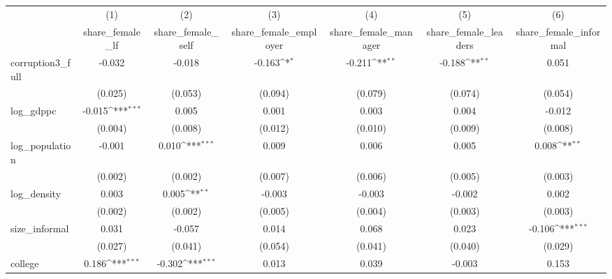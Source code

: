{
\def\sym#1{\ifmmode^{#1}\else\(^{#1}\)\fi}
\begin{tabular}{l*{6}{c}}
\hline\hline
            &\multicolumn{1}{c}{(1)}&\multicolumn{1}{c}{(2)}&\multicolumn{1}{c}{(3)}&\multicolumn{1}{c}{(4)}&\multicolumn{1}{c}{(5)}&\multicolumn{1}{c}{(6)}\\
            &\multicolumn{1}{c}{share\_female\_lf}&\multicolumn{1}{c}{share\_female\_self}&\multicolumn{1}{c}{share\_female\_employer}&\multicolumn{1}{c}{share\_female\_manager}&\multicolumn{1}{c}{share\_female\_leaders}&\multicolumn{1}{c}{share\_female\_informal}\\
\hline
corruption3\_full&      -0.032         &      -0.018         &      -0.163\sym{*}  &      -0.211\sym{**} &      -0.188\sym{**} &       0.051         \\
            &     (0.025)         &     (0.053)         &     (0.094)         &     (0.079)         &     (0.074)         &     (0.054)         \\
[1em]
log\_gdppc   &      -0.015\sym{***}&       0.005         &       0.001         &       0.003         &       0.004         &      -0.012         \\
            &     (0.004)         &     (0.008)         &     (0.012)         &     (0.010)         &     (0.009)         &     (0.008)         \\
[1em]
log\_population&      -0.001         &       0.010\sym{***}&       0.009         &       0.006         &       0.005         &       0.008\sym{**} \\
            &     (0.002)         &     (0.002)         &     (0.007)         &     (0.006)         &     (0.005)         &     (0.003)         \\
[1em]
log\_density &       0.003         &       0.005\sym{**} &      -0.003         &      -0.003         &      -0.002         &       0.002         \\
            &     (0.002)         &     (0.002)         &     (0.005)         &     (0.004)         &     (0.003)         &     (0.003)         \\
[1em]
size\_informal&       0.031         &      -0.057         &       0.014         &       0.068         &       0.023         &      -0.106\sym{***}\\
            &     (0.027)         &     (0.041)         &     (0.054)         &     (0.041)         &     (0.040)         &     (0.029)         \\
[1em]
college     &       0.186\sym{***}&      -0.302\sym{***}&       0.013         &       0.039         &      -0.003         &       0.153         \\

\end{tabular}}
